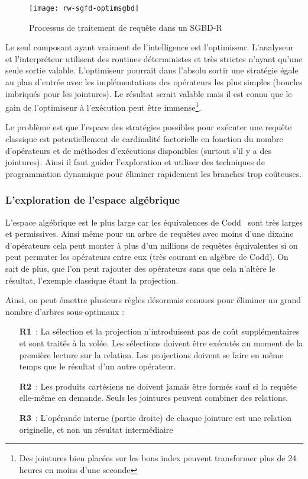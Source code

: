 \begin{figure}[h]
\centering
\texttt{[image: rw-sgfd-optimsgbd]}
\caption{Processus de traitement de requête dans un SGBD-R}\label{fig:rw:sgfd:optim:processus}
\end{figure}
Le seul composant ayant vraiment de l'intelligence est l'optimiseur. L'analyseur et l'interpréteur utilisent des routines déterministes et très strictes n'ayant qu'une seule sortie valable. L'optimiseur pourrait dans l'absolu sortir une stratégie égale au plan d'entrée avec les implémentations des opérateurs les plus simples (boucles imbriqués pour les jointures). Le résultat serait valable mais il est connu que le gain de l'optimiseur à l'exécution peut être immense\footnote{Des jointures bien placées sur les bons index peuvent transformer plus de 24 heures en moins d'une seconde}. 

Le problème est que l'espace des stratégies possibles pour exécuter une requête classique est potentiellement de cardinalité factorielle en fonction du nombre d'opérateurs et de méthodes d'exécutions disponibles (surtout s'il y a des jointures). Ainsi il faut guider l'exploration et utiliser des techniques de programmation dynamique pour éliminer rapidement les branches trop coûteuses.

\subsubsection{L'exploration de l'espace algébrique}
L'espace algébrique est le plus large car les équivalences de Codd~\cite{Codd:model} sont très larges et permissives. Ainsi même pour un arbre de requêtes avec moins d'une dixaine d'opérateurs cela peut monter à plus d'un millions de requêtes équivalentes si on peut permuter les opérateurs entre eux (très courant en algèbre de Codd). On sait de plus, que l'on peut rajouter des opérateurs sans que cela n'altère le résultat, l'exemple classique étant la projection.

Ainsi, on peut émettre plusieurs règles désormais connues pour éliminer un grand nombre d'arbres sous-optimaux :
\begin{itemize}
    \item[\textbf{R1}~:] La sélection et la projection n'introduisent pas de coût supplémentaires et sont traités à la volée. Les sélections doivent être exécutés au moment de la première lecture sur la relation. Les projections doivent se faire en même temps que le résultat d'un autre opérateur.
    \item[\textbf{R2}~:] Les produits cartésiens ne doivent jamais être formés sauf si la requête elle-même en demande. Seuls les jointures peuvent combiner des relations.
    \item[\textbf{R3}~:] L'opérande interne (partie droite) de chaque jointure est une relation originelle, et non un résultat intermédiaire
\end{itemize}

